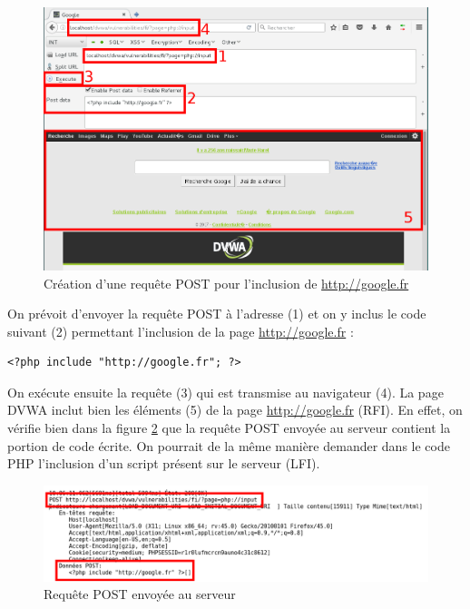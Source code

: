 \begin{figure}[!h]
\begin{center}
\includegraphics[scale=.35]{images/fi6.png}

\caption{Création d'une requête POST pour l'inclusion de \url{http://google.fr}}
\label{fi_dvwa6}
\end{center}
\end{figure}


On prévoit d'envoyer la requête POST à l'adresse  (1) et on y inclus le code suivant (2) permettant l'inclusion de la page \url{http://google.fr} :
\begin{lstlisting}
<?php include "http://google.fr"; ?>
\end{lstlisting}
On exécute ensuite la requête (3) qui est transmise au navigateur (4). La page DVWA inclut bien les éléments (5) de la page \url{http://google.fr} (RFI). En effet, on vérifie bien dans la figure \ref{fi_dvwa7} que la requête POST envoyée au serveur contient la portion de code écrite. On pourrait de la même manière demander dans le code PHP l'inclusion d'un script présent sur le serveur (LFI).

\begin{figure}[!h]
\begin{center}
\includegraphics[scale=.45]{images/fi7.png}

\caption{Requête POST envoyée au serveur}
\label{fi_dvwa7}
\end{center}
\end{figure}

